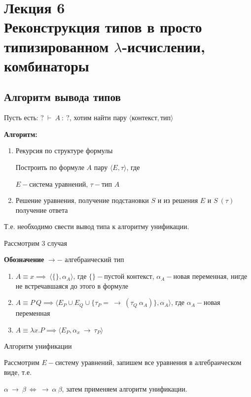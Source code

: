 		\section{Лекция 6 \\ Реконструкция типов в просто типизированном $\lambda$-исчислении, комбинаторы}
		\subsection{Алгоритм вывода типов}
					
			Пусть есть: $?\:\vdash \:A\: :\: ?$, хотим найти пару $\big \langle \text{контекст}, \text{тип} \big \rangle$\par
	\textbf{Алгоритм:}
	\begin{enumerate}
		\item Рекурсия по структуре формулы\par Построить по формуле $A$ пару $\big \langle E, \tau\big \rangle$, где\par $E-$система уравнений, $\tau-$тип $A$
		\item Решение уравнения, получение подстановки $S$ и из решения $E$ и $S\:(\tau)$ получение ответа	
	\end{enumerate}
		Т.е. необходимо свести вывод типа к алгоритму унификации.\par
		\begin{oun_paragraph}Рассмотрим 3 случая\end{oun_paragraph}
			\textbf{Обозначение } $\rightarrow-$ алгебраический тип 
			\begin{enumerate}
				\item $A\equiv x\implies\:\big \langle \{\}, \alpha_A\big\rangle$, где $\{\}-$пустой контекст, $\alpha_A-$новая переменная, нигде не встречавшаяся до этого в формуле
				\item $A\equiv P\:Q\implies\big \langle E_P\cup E_Q\cup \{\tau_P=\:\rightarrow\:(\tau_Q\:\alpha_A)\}, \alpha_A\big \rangle$, где $\alpha_A-$новая переменная
				\item $A\equiv\lambda x.P\implies\big\langle E_P,\alpha_x\:\rightarrow\:\tau_P\big\rangle$
			\end{enumerate}
		\begin{oun_paragraph}Алгоритм унификации\end{oun_paragraph} 
			Рассмотрим $E-$систему уравнений, запишем все уравнения в алгебраическом виде, т.е. \par $\alpha\:\rightarrow\:\beta\:\Leftrightarrow\:\rightarrow\:\alpha\:\beta$, затем применяем алгоритм унификации.
